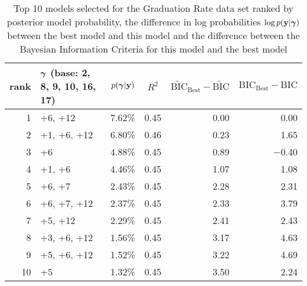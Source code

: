 \begin{table}
	\begin{center}
		\begin{tabular}{r|l|r|c|r|r}
			rank & ${\boldsymbol \gamma}$ (base: 2, 8, 9, 10, 16, 17) & $p({\boldsymbol \gamma}|{\bf y})$ & $R^2$ & $\widetilde{\text{BIC}}_\text{Best} - \widetilde{\text{BIC}}$ & $\text{BIC}_\text{Best} - \text{BIC}$ \\
			\hline
			1 &  +6, +12&  7.62\%&  0.45&  0.00&  0.00\\
			2 &  +1, +6, +12&  6.80\%&  0.46&  0.23&  1.65\\
			3 &  +6&  4.88\%&  0.45&  0.89&  $-$0.40\\
			4 &  +1, +6&  4.46\%&  0.45&  1.07&  1.08\\
			5 &  +6, +7&  2.43\%&  0.45&  2.28&  2.31\\
			6 &  +6, +7, +12&  2.37\%&  0.45&  2.33&  3.79\\
			7 &  +5, +12&  2.29\%&  0.45&  2.41&  2.43\\
			8 &  +3, +6, +12&  1.56\%&  0.45&  3.17&  4.63\\
			9 &  +5, +6, +12&  1.52\%&  0.45&  3.22&  4.69\\
			10 &  +5&  1.32\%&  0.45&  3.50&  2.24\\
		\end{tabular}
	\end{center}
	\label{tab:numerical_results_gradrate}
	\caption{Top 10 models selected for the Graduation Rate data set ranked by posterior model probability, the
		difference in log probabilities $\log p({\bf y}|{\boldsymbol \gamma})$ between the best model and this model and the difference between the Bayesian Information Criteria for this model and the best model}
\end{table}

